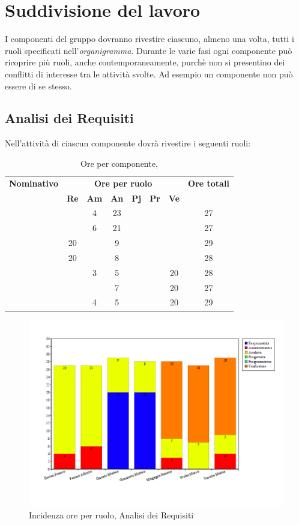 \section{Suddivisione del lavoro}
I componenti del gruppo dovranno rivestire ciascuno, almeno una volta, tutti i ruoli specificati nell'\textit{organigramma}.
Durante le varie fasi ogni componente può ricoprire più ruoli, anche contemporaneamente, purchè non si presentino dei conflitti di interesse tra le attività svolte. Ad esempio un componente non può essere \textit{\Ver} di se stesso.
\subsection{Analisi dei Requisiti}
Nell'attività di \textit{\AdR} ciascun componente dovrà rivestire i seguenti ruoli:
\begin{table}[H]
	\begin{center}
		\begin{tabular}{|c|c|c|c|c|c|c|c|}
			\hline
			\textbf{Nominativo} & \multicolumn{6}{c|}{\textbf{Ore per ruolo}} & \textbf{Ore totali} \\
			& \textbf{Re} & \textbf{Am} & \textbf{An} & \textbf{Pj} & \textbf{Pr} & \textbf{Ve} & \\
			\hline
			\FB	&		&	4	&	23	&		&		&		&	27	\\
			\hline
			\AF		&		&	6	&	21	&	 	&		&		& 	27	\\
			\hline
			\GN		&	20	&		&	9	&		&		&		&	29	\\
			\hline						
			\GR	&	20	&	 	&	8 	&		&	 	& 		&	28	\\
			\hline
			\SM 		&		&	3	&	5	&		&		& 	20	&	28	\\
			\hline
			\MP		& 		&		&	7	&		&		&	20	&	27	\\
			\hline						
			\MV 		&		&	4	&	5	&		&		&	20	& 	29	\\
			\hline
		\end{tabular}
	\end{center}
	\caption{Ore per componente, \AdR}
\end{table}

\begin{figure}[H]
	\centering
	\includegraphics[scale=0.4]{immagini/Grafi/GrafoAR}
	\caption{Incidenza ore per ruolo, Analisi dei Requisiti}
\end{figure}


